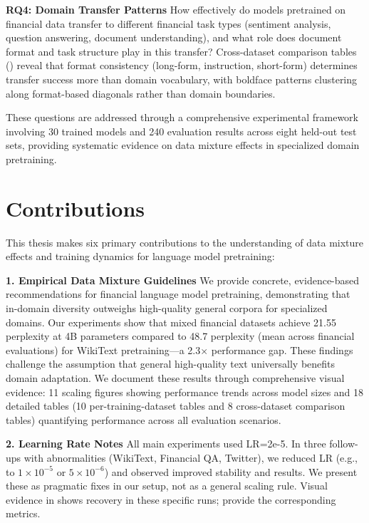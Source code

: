\textbf{RQ4: Domain Transfer Patterns}
How effectively do models pretrained on financial data transfer to different financial task types (sentiment analysis, question answering, document understanding), and what role does document format and task structure play in this transfer? Cross-dataset comparison tables () reveal that format consistency (long-form, instruction, short-form) determines transfer success more than domain vocabulary, with boldface patterns clustering along format-based diagonals rather than domain boundaries.

These questions are addressed through a comprehensive experimental framework involving 30 trained models and 240 evaluation results across eight held-out test sets, providing systematic evidence on data mixture effects in specialized domain pretraining.

\section{Contributions}

This thesis makes six primary contributions to the understanding of data mixture effects and training dynamics for language model pretraining:

\textbf{1. Empirical Data Mixture Guidelines}
We provide concrete, evidence-based recommendations for financial language model pretraining, demonstrating that in-domain diversity outweighs high-quality general corpora for specialized domains. Our experiments show that mixed financial datasets achieve 21.55 perplexity at 4B parameters compared to 48.7 perplexity (mean across financial evaluations) for WikiText pretraining—a 2.3$\times$ performance gap. These findings challenge the assumption that general high-quality text universally benefits domain adaptation. We document these results through comprehensive visual evidence: 11 scaling figures showing performance trends across model sizes and 18 detailed tables (10 per-training-dataset tables and 8 cross-dataset comparison tables) quantifying performance across all evaluation scenarios.

\textbf{2. Learning Rate Notes}
All main experiments used LR=2e-5. In three follow-ups with abnormalities (WikiText, Financial QA, Twitter), we reduced LR (e.g., to $1\times10^{-5}$ or $5\times10^{-6}$) and observed improved stability and results. We present these as pragmatic fixes in our setup, not as a general scaling rule. Visual evidence in  shows recovery in these specific runs;  provide the corresponding metrics.


